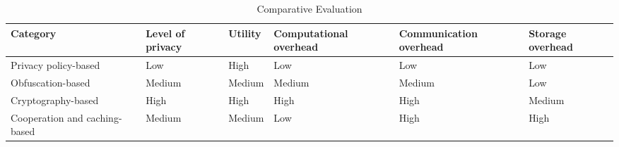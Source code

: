 \documentclass{acmart}
\begin{document}
\begin{table}[H]
\begin{tabular}{|p{2cm}|p{2cm}|p{2cm}|p{2cm}|p{2cm}|p{2cm}|} 
    \hline
    Category&Level of privacy&Utility&Computational overhead&Communication overhead&Storage overhead  \\
    \hline
    Privacy policy-based&Low&High&Low&Low&Low \\
    \hline
    Obfuscation-based&Medium&Medium&Medium&Medium&Low \\
    \hline
    Cryptography-based&High&High&High&High&Medium \\
    \hline
    Cooperation and caching-based&Medium&Medium&Low&High&High \\
    \hline
\end{tabular}
\caption{Comparative Evaluation}
\label{tab1}
\end{table}
\end{document}
